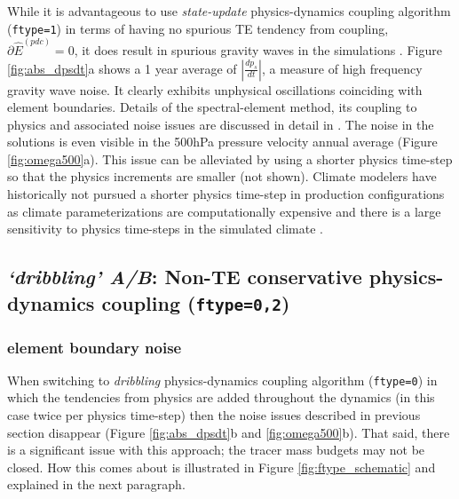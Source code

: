 \documentclass[draft,linenumbers]{agujournal}
\newcommand*{\gi}[1]{\widehat{#1}}
\begin{document}
While it is advantageous to use {\em{state-update}} physics-dynamics coupling algorithm ({\tt{ftype=1}}) in terms of having no spurious TE tendency from coupling, $\partial \gi{E}^{({pdc})}=0$, it does result in spurious gravity waves in the simulations \cite[see, e.g., Figure 5 in ][]{GetAl2018MWR}. Figure \ref{fig:abs_dpsdt}a shows a 1 year average of $|\frac{dp_s}{dt}|$, a measure of high frequency gravity wave noise. It clearly exhibits unphysical oscillations coinciding with element boundaries. Details of the spectral-element method, its coupling to physics and associated noise issues are discussed in detail in \citet{HetAl2018MWR}. The noise in the solutions is even visible in the 500hPa pressure velocity annual average (Figure \ref{fig:omega500}a). This issue can be alleviated by using a shorter physics time-step so that the physics increments are smaller (not shown). Climate modelers have historically not pursued a shorter physics time-step in production configurations as climate parameterizations are computationally expensive and there is a large sensitivity to physics time-steps in the simulated climate \citep[e.g.][]{WO2003QJR,WetAl2015JAMES}.

\subsection{{\em{`dribbling' A/B}}: Non-TE conservative physics-dynamics coupling ({\tt{ftype=0,2}})}\label{se:pdc_problem}
{\color{red}{Before discussing the impact of different PDC methods on the TE budget, we discuss element boundary noise issues in CAM-SE which are related to PDC method. This motivates the different PDC methods implemented in CAM-SE.}}
\subsubsection{{\color{red}{Spurious }}element boundary noise {\color{red}{from physics-dynamics coupling}}}\label{sec:noise}
When switching to {\em{dribbling}} physics-dynamics coupling algorithm ({\tt{ftype=0}}) in which the tendencies from physics are added throughout the dynamics (in this case twice per physics time-step) then the noise issues described in previous section disappear (Figure \ref{fig:abs_dpsdt}b and \ref{fig:omega500}b). That said, there is a significant issue with this approach; the tracer mass budgets may not be closed. How this comes about is illustrated in Figure \ref{fig:ftype_schematic} and explained in the next paragraph. 
\end{document}
